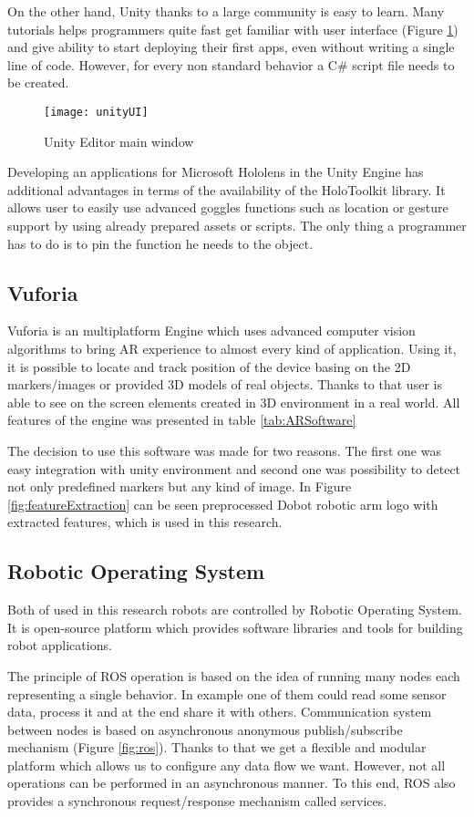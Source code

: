 \documentclass[printmode,en]{mgr}
\begin{document}
On the other hand, Unity thanks to a large community is easy to learn. Many tutorials helps programmers quite fast get familiar with user interface (Figure \ref{fig:unityUI}) and give ability to start deploying their first apps, even without writing a single line of code. However, for every non standard behavior a C\# script file needs to be created.

\begin{figure}[!ht]
  \centering
    \texttt{[image: unityUI]}
  \caption{Unity Editor main window}
  \label{fig:unityUI}
\end{figure}

Developing an applications for Microsoft Hololens in the Unity Engine has additional advantages in terms of the availability of the HoloToolkit library. It allows user to easily use advanced goggles functions such as location or gesture support by using already prepared assets or scripts. The only thing a programmer has to do is to pin the function he needs to the object.

\subsection{Vuforia}
Vuforia is an multiplatform Engine which uses advanced computer vision algorithms to bring AR experience to almost every kind of application. Using it, it is possible to locate and track position of the device basing on the 2D markers/images or provided 3D models of real objects. Thanks to that user is able to see on the screen elements created in 3D environment in a real world. All features of the engine was presented in table \ref{tab:ARSoftware}

The decision to use this software was made for two reasons. The first one was easy integration with unity environment and second one was possibility to detect not only predefined markers but any kind of image. In Figure \ref{fig:featureExtraction} can be seen preprocessed Dobot robotic arm logo with extracted features, which is used in this research.

\subsection{Robotic Operating System}
Both of used in this research robots are controlled by Robotic Operating System. It is open-source platform which provides software libraries and tools for building robot applications.

The principle of ROS operation is based on the idea of running many nodes each representing a single behavior. In example one of them could read some sensor data, process it and at the end share it with others. Communication system between nodes is based on asynchronous anonymous publish/subscribe mechanism (Figure \ref{fig:ros}). Thanks to that we get a flexible and modular platform which allows us to configure any data flow we want. However, not all operations can be performed in an asynchronous manner. To this end, ROS also provides a synchronous request/response mechanism called services.
\end{document}
